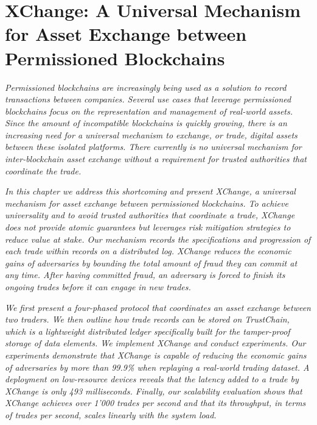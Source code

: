 \chapter{XChange: A Universal Mechanism for Asset Exchange between Permissioned Blockchains}
\label{chapter:xchange}

\emph{Permissioned blockchains are increasingly being used as a solution to record transactions between companies.
Several use cases that leverage permissioned blockchains focus on the representation and management of real-world assets.
Since the amount of incompatible blockchains is quickly growing, there is an increasing need for a universal mechanism to exchange, or trade, digital assets between these isolated platforms.
There currently is no \emph{universal} mechanism for inter-blockchain asset exchange without a requirement for trusted authorities that coordinate the trade.}

\emph{In this chapter we address this shortcoming and present XChange, a universal mechanism for asset exchange between permissioned blockchains.
To achieve universality and to avoid trusted authorities that coordinate a trade, XChange does not provide atomic guarantees but leverages risk mitigation strategies to reduce value at stake.
Our mechanism records the specifications and progression of each trade within records on a distributed log.
XChange reduces the economic gains of adversaries by bounding the total amount of fraud they can commit at any time.
After having committed fraud, an adversary is forced to finish its ongoing trades before it can engage in new trades.}

\emph{We first present a four-phased protocol that coordinates an asset exchange between two traders.
We then outline how trade records can be stored on TrustChain, which is a lightweight distributed ledger specifically built for the tamper-proof storage of data elements.
We implement XChange and conduct experiments.
Our experiments demonstrate that XChange is capable of reducing the economic gains of adversaries by more than 99.9\% when replaying a real-world trading dataset.
A deployment on low-resource devices reveals that the latency added to a trade by XChange is only 493 milliseconds.
Finally, our scalability evaluation shows that XChange achieves over 1'000 trades per second and that its throughput, in terms of trades per second, scales linearly with the system load.}

\newpage

